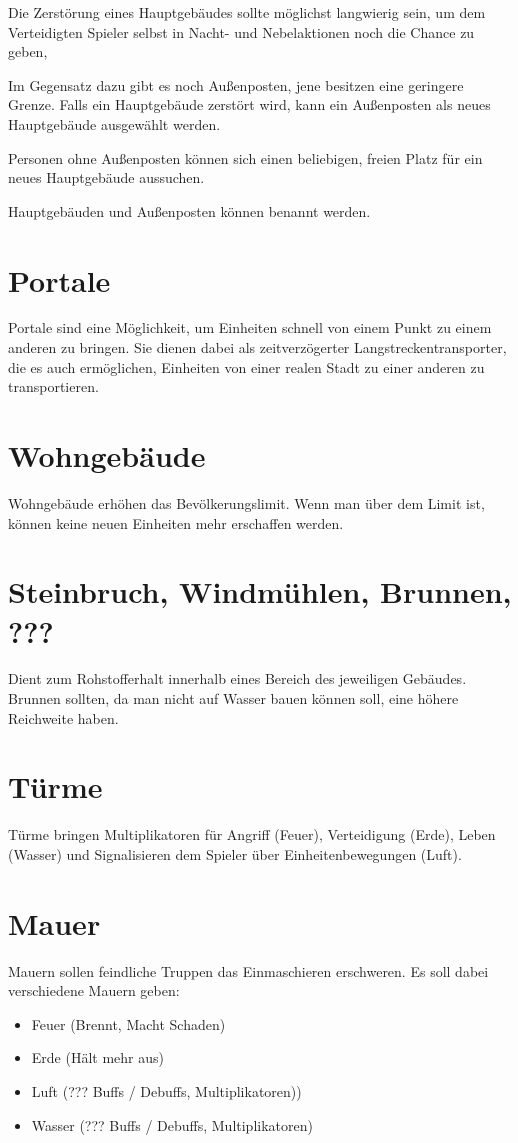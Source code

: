 Die Zerstörung eines Hauptgebäudes sollte möglichst langwierig sein, um dem Verteidigten Spieler selbst in Nacht- und Nebelaktionen noch die Chance zu geben, 

Im Gegensatz dazu gibt es noch Außenposten, jene besitzen eine geringere Grenze. Falls ein Hauptgebäude zerstört wird, kann ein Außenposten als neues Hauptgebäude ausgewählt werden.

Personen ohne Außenposten können sich einen beliebigen, freien Platz für ein neues Hauptgebäude aussuchen.

Hauptgebäuden und Außenposten können benannt werden.

\section{Portale}
Portale sind eine Möglichkeit, um Einheiten schnell von einem Punkt zu einem anderen zu bringen. Sie dienen dabei als zeitverzögerter Langstreckentransporter, die es auch ermöglichen, Einheiten von einer realen Stadt zu einer anderen zu transportieren.

\section{Wohngebäude}
Wohngebäude erhöhen das Bevölkerungslimit. Wenn man über dem Limit ist, können keine neuen Einheiten mehr erschaffen werden.

\section{Steinbruch, Windmühlen, Brunnen, ???}
Dient zum Rohstofferhalt innerhalb eines Bereich des jeweiligen Gebäudes. Brunnen sollten, da man nicht auf Wasser bauen können soll, eine höhere Reichweite haben.

\section{Türme}
Türme bringen Multiplikatoren für Angriff (Feuer), Verteidigung (Erde), Leben (Wasser) und Signalisieren  dem Spieler über Einheitenbewegungen (Luft). 


\section{Mauer}
Mauern sollen feindliche Truppen das Einmaschieren erschweren. Es soll dabei verschiedene Mauern geben:

\begin{itemize}
\item Feuer (Brennt, Macht Schaden)
\item Erde (Hält mehr aus)
\item Luft (??? Buffs / Debuffs, Multiplikatoren))
\item Wasser (??? Buffs / Debuffs, Multiplikatoren)
\end{itemize}

